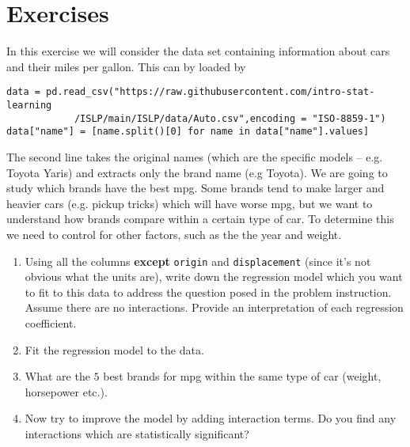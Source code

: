 \section*{Exercises}
\begin{exercise}
In this exercise we will consider the data set containing information about cars and their miles per gallon. This can by loaded by 
\begin{Verbatim}
data = pd.read_csv("https://raw.githubusercontent.com/intro-stat-learning
			/ISLP/main/ISLP/data/Auto.csv",encoding = "ISO-8859-1")
data["name"] = [name.split()[0] for name in data["name"].values]
\end{Verbatim}
The second line takes the original names (which are the specific models -- e.g. Toyota Yaris) and extracts only the brand name (e.g  Toyota). We are going to study which brands have the best mpg. Some brands tend to make larger and heavier cars (e.g. pickup tricks) which will have worse mpg, but we want to understand how brands compare within a certain type of car. To determine this we need to control for other factors, such as the the year and weight. 
\begin{enumerate}[label=(\alph*)]
\item Using all the columns {\bf except} \verb!origin! and \verb!displacement! (since it's not obvious what the units are), write down the regression model which you want to fit to this data to address the question posed in the problem instruction. Assume there are no interactions. Provide an interpretation of each regression coefficient.  
\item Fit the regression model to the data. 
\item What are the $5$ best brands for mpg within the same type of car (weight, horsepower etc.).
\item Now try to improve the model by adding interaction terms. Do you find any interactions which are statistically significant? 
\end{enumerate}

\end{exercise}
